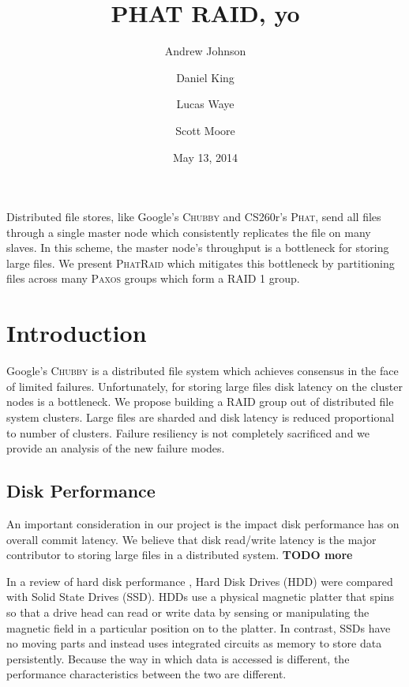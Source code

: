 \documentclass[10pt,letter]{article}
\newcommand{\chubby}[0]{\textsc{Chubby}}
\newcommand{\phat}[0]{\textsc{Phat}}
\newcommand{\phatraid}[0]{\textsc{PhatRaid}}
\newcommand{\raid}[1]{\textsc{RAID #1}}
\newcommand{\paxos}[0]{\textsc{Paxos}}
\begin{document}
\title{PHAT RAID, yo}
\author{Andrew Johnson \and Daniel King \and Lucas Waye \and Scott Moore}
\date{May 13, 2014}

\maketitle

Distributed file stores, like Google's \chubby{} and CS260r's \phat{}, send all
files through a single master node which consistently replicates the file on
many slaves. In this scheme, the master node's throughput is a bottleneck for
storing large files. We present \phatraid{} which mitigates this bottleneck by
partitioning files across many \paxos{} groups which form a \raid{1} group.

\section{Introduction}

Google's \chubby{}\cite{burrows-chubby} is a distributed file system which
achieves consensus in the face of limited failures. Unfortunately, for storing
large files disk latency on the cluster nodes is a bottleneck. We propose
building a RAID group out of distributed file system clusters. Large files are
sharded and disk latency is reduced proportional to number of clusters. Failure
resiliency is not completely sacrificed and we provide an analysis of the
new failure modes.

\subsection{Disk Performance}

An important consideration in our project is the impact disk performance has on overall commit latency. We believe that disk read/write latency is the major contributor to storing large files in a distributed system. {\bf TODO more}

In a review of hard disk performance \cite{disk-perf}, Hard Disk Drives (HDD) were compared with Solid State Drives (SSD). HDDs use a physical magnetic platter that spins so that a drive head can read or write data by sensing or manipulating the magnetic field in a particular position on to the platter. In contrast, SSDs have no moving parts and instead uses integrated circuits as memory to store data persistently. Because the way in which data is accessed is different, the performance characteristics between the two are different.
\end{document}
